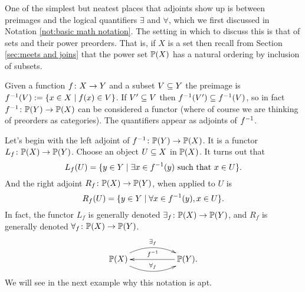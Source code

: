 \documentclass[CT4S-EN-RU]{subfiles}
\begin{document}

\subsubsection{}

One of the simplest but neatest places that adjoints show up is between preimages and the logical quantifiers $\exists$ and $\forall$, which we first discussed in Notation \ref{not:basic math notation}.  The setting in which to discuss this is that of sets and their power preorders. That is, if $X$ is a set then recall from Section \ref{sec:meets and joins} that the power set $\PP(X)$ has a natural ordering by inclusion of subsets. 

Given a function $f\taking X\to Y$ and a subset $V\ss Y$ the preimage is $f^\m1(V):=\{x\in X\|f(x)\in V\}$. If $V'\ss V$ then $f^\m1(V')\ss f^\m1(V)$, so in fact $f^\m1\taking\PP(Y)\to\PP(X)$ can be considered a functor (where of course we are thinking of preorders as categories). The quantifiers appear as adjoints of $f^\m1$.

Let's begin with the left adjoint of $f^\m1\taking\PP(Y)\to\PP(X)$. It is a functor $L_f\taking\PP(X)\to\PP(Y)$. Choose an object $U\ss X$ in $\PP(X)$. It turns out that
$$L_f(U)=\{y\in Y\|\exists x\in f^\m1(y)\tn{ such that }x\in U\}.$$
And the right adjoint $R_f\taking\PP(X)\to\PP(Y)$, when applied to $U$ is 
$$R_f(U)=\{y\in Y\|\forall x\in f^\m1(y), x\in U\}.$$
In fact, the functor $L_f$ is generally denoted $\exists_f\taking\PP(X)\to\PP(Y)$, and $R_f$ is generally denoted $\forall_f\taking\PP(X)\to\PP(Y)$. 
$$
\xymatrix{\PP(X)\ar@/^1.2pc/[rr]^{\exists_f}\ar@/_1.2pc/[rr]^{\forall_f}&&\PP(Y)\ar[ll]_{f^\m1}.}
$$
We will see in the next example why this notation is apt.
\end{document}

